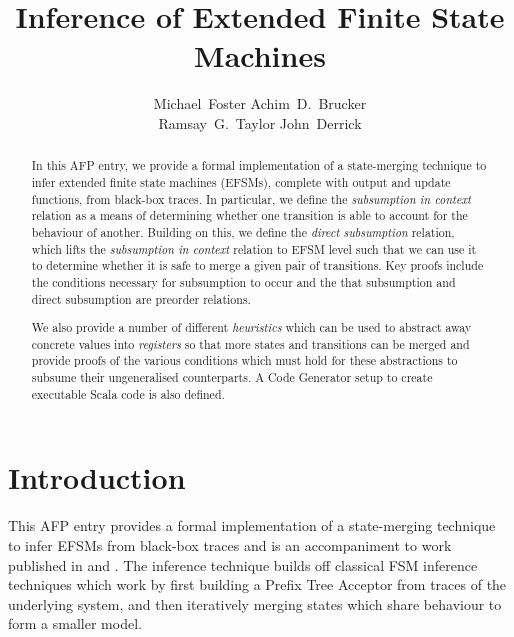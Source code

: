 \documentclass[10pt,DIV16,a4paper,abstract=true,twoside=semi,openright]{scrreprt}
\title{Inference of Extended Finite State Machines}%
\author{%
\begin{minipage}{.8\textwidth}
  \centering
      Michael~Foster\footnotemark[1]\orcidID{0000-0001-8233-9873}%
      \qquad\qquad%
      Achim~D.~Brucker\footnotemark[2]\orcidID{0000-0002-6355-1200}%
      \\%
      Ramsay~G.~Taylor\footnotemark[1]\orcidID{0000-0002-4036-7590}%
      \qquad\qquad%
      John~Derrick\footnotemark[1]\orcidID{0000-0002-6631-8914}%
     \end{minipage}
}
\begin{document}
\maketitle
\begin{abstract}
  In this AFP entry, we provide a formal implementation of a state-merging technique to infer extended finite state machines (EFSMs), complete with output and update functions, from black-box traces. In particular, we define the \emph{subsumption in context} relation as a means of determining whether one transition is able to account for the behaviour of another. Building on this, we define the \emph{direct subsumption} relation, which lifts the \emph{subsumption in context} relation to EFSM level such that we can use it to determine whether it is safe to merge a given pair of transitions. Key proofs include the conditions necessary for subsumption to occur and the that subsumption and direct subsumption are preorder relations.

  We also provide a number of different \emph{heuristics} which can be used to abstract away concrete values into \emph{registers} so that more states and transitions can be merged and provide proofs of the various conditions which must hold for these abstractions to subsume their ungeneralised counterparts. A Code Generator setup to create executable Scala code is also defined.
  \begin{quote}
    \bigskip
  \end{quote}
\end{abstract}


\tableofcontents
\cleardoublepage

\chapter{Introduction}\label{chap:intro}
This AFP entry provides a formal implementation of a state-merging technique to infer EFSMs from black-box traces and is an accompaniment to work published in \cite{foster2018} and \cite{foster2019}. The inference technique builds off classical FSM inference techniques which work by first building a Prefix Tree Acceptor from traces of the underlying system, and then iteratively merging states which share behaviour to form a smaller model.
\end{document}

